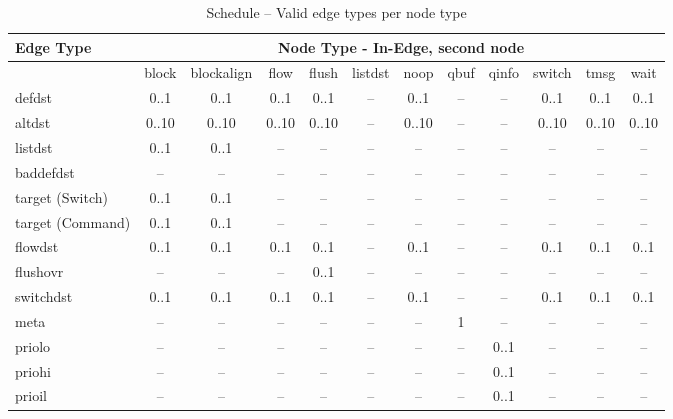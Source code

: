 \begin{table}
\begin{adjustwidth}{-25mm}{}
\caption{Schedule -- Valid edge types per node type}
\begin{tabular}[t]{|l|c|c|c|c|c|c|c|c|c|c|c|}

\hline
Edge Type & \multicolumn{11}{c|}{Node Type - In-Edge, second node} \\
\hline
                 & block & blockalign & flow  & flush & listdst & noop  & qbuf & qinfo & switch & tmsg & wait  \\
\hline
defdst           & 0..1  & 0..1       & 0..1  & 0..1  & --      & 0..1  & --   & --    & 0..1   & 0..1  & 0..1  \\
altdst           & 0..10 & 0..10      & 0..10 & 0..10 & --      & 0..10 & --   & --    & 0..10  & 0..10 & 0..10 \\
listdst          & 0..1  & 0..1       & --    & --    & --      & --    & --   & --    & --     & --    & --    \\
baddefdst        & --    & --         & --    & --    & --      & --    & --   & --    & --     & --    & --    \\
target (Switch)  & 0..1  & 0..1       & --    & --    & --      & --    & --   & --    & --     & --    & --    \\
target (Command) & 0..1  & 0..1       & --    & --    & --      & --    & --   & --    & --     & --    & --    \\
flowdst          & 0..1  & 0..1       & 0..1  & 0..1  & --      & 0..1  & --   & --    & 0..1   & 0..1  & 0..1  \\
flushovr         & --    & --         & --    & 0..1  & --      & --    & --   & --    & --     & --    & --    \\
switchdst        & 0..1  & 0..1       & 0..1  & 0..1  & --      & 0..1  & --   & --    & 0..1   & 0..1  & 0..1  \\
meta             & --    & --         & --    & --    & --      & --    & 1    & --    & --     & --    & --    \\
priolo           & --    & --         & --    & --    & --      & --    & --   & 0..1  & --     & --    & --    \\
priohi           & --    & --         & --    & --    & --      & --    & --   & 0..1  & --     & --    & --    \\
prioil           & --    & --         & --    & --    & --      & --    & --   & 0..1  & --     & --    & --    \\

\end{tabular}
\end{adjustwidth}
\end{table}
